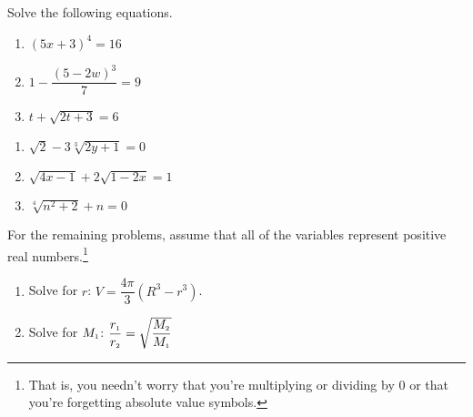 \documentclass{ximera}
\begin{document}
\begin{example}\label{radicaleqnreview}  Solve the following equations.


\begin{multicols}{3}
\begin{enumerate}


\item  $(5x +3)^{4} = 16$

\item  $1 - \dfrac{(5-2w)^3}{7} = 9$

\item  $t + \sqrt{2t+3} = 6$


\setcounter{HW}{\value{enumi}}
\end{enumerate}
\end{multicols}

\begin{multicols}{3}
\begin{enumerate}

\setcounter{enumi}{\value{HW}}

\item $\sqrt{2} - 3\sqrt[3]{2y+1} = 0$ 

\item  $\sqrt{4x-1}  + 2\sqrt{1 - 2x} = 1$

\item  $\sqrt[4]{n^2 + 2} + n = 0$

\setcounter{HW}{\value{enumi}}
\end{enumerate}
\end{multicols}

For the remaining problems, assume that all of the variables represent positive real numbers.\footnote{That is, you needn't worry that you're multiplying or dividing by $0$ or that you're forgetting absolute value symbols.}

\begin{multicols}{2}
\begin{enumerate}

\setcounter{enumi}{\value{HW}}

\item  Solve for $r$:  $V = \dfrac{4\pi}{3}(R^3 - r^3)$.
\item  Solve for $M_{\text{\tiny$1$}}$:  $\dfrac{r_{\text{\tiny$1$}}}{r_{\text{\tiny$2$}}} = \sqrt{\dfrac{M_{\text{\tiny$2$}}}{M_{\text{\tiny$1$}}}}$



\end{enumerate}
\end{multicols}
\end{example}
\end{document}
